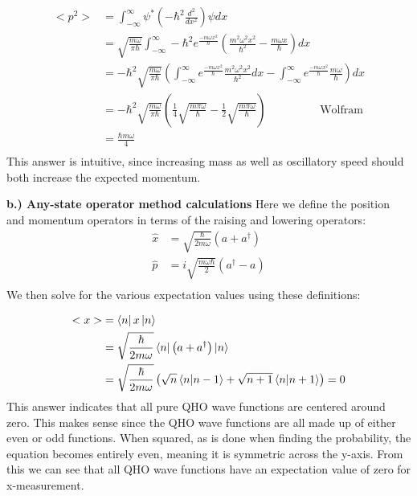 \documentclass[10pt]{article} %
\begin{document}
\begin{align*}
  <p^2> &= \int_{-\infty}^{\infty} \psi^* \left(-\hbar^2 \frac{d^2}{dx^2}\right)\psi dx\\
  &= \sqrt{\frac{m\omega}{\pi\hbar}}\int_{-\infty}^{\infty} -\hbar^2e^{\frac{-m\omega x^2}{\hbar}}
  \left(\frac{m^2\omega^2x^2}{\hbar^2} - \frac{m\omega x}{\hbar}\right)dx\\
  &= -\hbar^2\sqrt{\frac{m\omega}{\pi\hbar}}\left(
  \int_{-\infty}^{\infty} e^{\frac{-m\omega x^2}{\hbar}}\frac{m^2\omega^2x^2}{\hbar^2}dx -
  \int_{-\infty}^{\infty} e^{\frac{-m\omega x^2}{\hbar}}\frac{m\omega}{\hbar}\right)dx\\
  &= -\hbar^2\sqrt{\frac{m\omega}{\pi\hbar}}
  \left(\frac{1}{4}\sqrt{\frac{m\pi\omega}{\hbar}} -
  \frac{1}{2}\sqrt{\frac{m\pi\omega}{\hbar}}\right) \hspace{2cm}\mbox{Wolfram}\\
  &= \frac{\hbar m\omega}{4}\\
\end{align*}
This answer is intuitive, since increasing mass as well as oscillatory speed should both increase
the expected momentum.

\textbf{b.) Any-state operator method calculations}
Here we define the position and momentum operators in terms of the raising and lowering operators:
\begin{align*}
  \hat{x} &= \sqrt{\frac{\hbar}{2m\omega}}\left(a + a^\dagger\right)\\
  \hat{p} &= i\sqrt{\frac{m\omega\hbar}{2}}\left(a^\dagger - a\right)\\
\end{align*}
We then solve for the various expectation values using these definitions:

\begin{align*}
  <x> &= \bra{n}x\ket{n}\\
  &= \sqrt{\frac{\hbar}{2m\omega}}\bra{n}\left(a + a^\dagger\right)\ket{n}\\
  &= \sqrt{\frac{\hbar}{2m\omega}}
  \left(\sqrt{n}\bra{n}\ket{n-1} + \sqrt{n+1}\bra{n}\ket{n+1}\right) = 0\\
\end{align*}
This answer indicates that all pure QHO wave functions are centered around zero. This makes
sense since the QHO wave functions are all made up of either even or odd functions. When squared,
as is done when finding the probability, the equation becomes entirely even, meaning it is
symmetric across the y-axis. From this we can see that all QHO wave functions have an expectation
value of zero for x-measurement.
\end{document}
